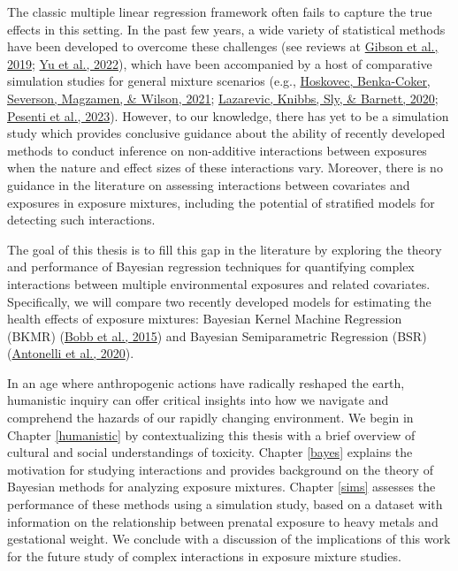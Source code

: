 \documentclass[12pt, twoside]{amherstthesis}
\begin{document}
The classic multiple linear regression framework often fails to capture the true effects in this setting. In the past few years, a wide variety of statistical methods have been developed to overcome these challenges (see reviews at \protect\hyperlink{ref-gibson_overview_2019}{Gibson et al., 2019}; \protect\hyperlink{ref-yu_review_2022}{Yu et al., 2022}), which have been accompanied by a host of comparative simulation studies for general mixture scenarios (e.g., \protect\hyperlink{ref-hoskovec_model_2021}{Hoskovec, Benka-Coker, Severson, Magzamen, \& Wilson, 2021}; \protect\hyperlink{ref-lazarevic_performance_2020}{Lazarevic, Knibbs, Sly, \& Barnett, 2020}; \protect\hyperlink{ref-pesenti_comparative_2023}{Pesenti et al., 2023}). However, to our knowledge, there has yet to be a simulation study which provides conclusive guidance about the ability of recently developed methods to conduct inference on non-additive interactions between exposures when the nature and effect sizes of these interactions vary. Moreover, there is no guidance in the literature on assessing interactions between covariates and exposures in exposure mixtures, including the potential of stratified models for detecting such interactions.

The goal of this thesis is to fill this gap in the literature by exploring the theory and performance of Bayesian regression techniques for quantifying complex interactions between multiple environmental exposures and related covariates. Specifically, we will compare two recently developed models for estimating the health effects of exposure mixtures: Bayesian Kernel Machine Regression (BKMR) (\protect\hyperlink{ref-bobb_bayesian_2015}{Bobb et al., 2015}) and Bayesian Semiparametric Regression (BSR) (\protect\hyperlink{ref-antonelli_estimating_2020}{Antonelli et al., 2020}).

In an age where anthropogenic actions have radically reshaped the earth, humanistic inquiry can offer critical insights into how we navigate and comprehend the hazards of our rapidly changing environment. We begin in Chapter \ref{humanistic} by contextualizing this thesis with a brief overview of cultural and social understandings of toxicity. Chapter \ref{bayes} explains the motivation for studying interactions and provides background on the theory of Bayesian methods for analyzing exposure mixtures. Chapter \ref{sims} assesses the performance of these methods using a simulation study, based on a dataset with information on the relationship between prenatal exposure to heavy metals and gestational weight. We conclude with a discussion of the implications of this work for the future study of complex interactions in exposure mixture studies.
\end{document}
